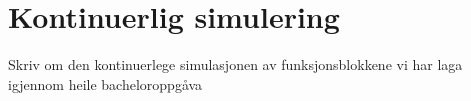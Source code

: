 \section{Kontinuerlig simulering}
\thispagestyle{fancy}

Skriv om den kontinuerlege simulasjonen av funksjonsblokkene vi har laga igjennom heile bacheloroppgåva
